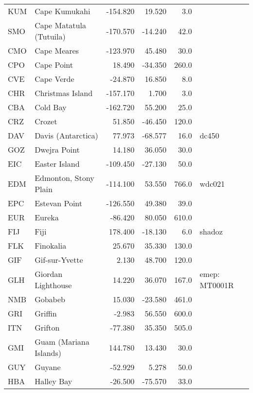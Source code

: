 \begin{table*}[!th]
\begin{tabular}{llrrrl}
KUM & Cape Kumukahi               &   -154.820 &  19.520 &     3.0 &\\
SMO & Cape Matatula (Tutuila)     &   -170.570 & -14.240 &    42.0 &\\
CMO & Cape Meares                 &   -123.970 &  45.480 &    30.0 &\\
CPO & Cape Point                  &     18.490 & -34.350 &   260.0 &\\
CVE & Cape Verde                  &    -24.870 &  16.850 &     8.0 &\\
CHR & Christmas Island             &  -157.170 &   1.700 &     3.0 &\\
CBA & Cold Bay                    &   -162.720 &  55.200 &    25.0 &\\
CRZ & Crozet                      &     51.850 & -46.450 &   120.0 &\\
DAV & Davis (Antarctica)          &     77.973 & -68.577 &    16.0 & dc450\\
GOZ & Dwejra Point                &     14.180 &  36.050 &    30.0 &\\
EIC & Easter Island               &   -109.450 & -27.130 &    50.0 &\\
EDM & Edmonton, Stony Plain       &   -114.100 &  53.550 &   766.0 & wdc021\\
EPC & Estevan Point               &   -126.550 &  49.380 &    39.0 &\\
EUR & Eureka                      &    -86.420 &  80.050 &   610.0 &\\
FIJ & Fiji                        &    178.400 & -18.130 &     6.0 & shadoz\\
FLK & Finokalia                   &     25.670 &  35.330 &   130.0 &\\
GIF & Gif-sur-Yvette              &      2.130 &  48.700 &   120.0 &\\
GLH & Giordan Lighthouse          &     14.220 &  36.070 &   167.0 & emep: MT0001R\\
NMB & Gobabeb                     &     15.030 & -23.580 &   461.0 &\\
GRI & Griffin                     &     -2.983 &  56.550 &   600.0 &\\
ITN & Grifton                     &    -77.380 &  35.350 &   505.0 &\\
GMI & Guam (Mariana Islands)      &    144.780 &  13.430 &    30.0 &\\
GUY & Guyane                      &    -52.929 &   5.278 &    50.0 &\\
HBA & Halley Bay                  &    -26.500 & -75.570 &    33.0 &\\

\end{tabular}
\end{table*}
